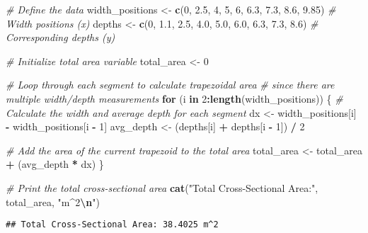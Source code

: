 \documentclass[
]{article}
\newenvironment{Shaded}{\begin{snugshade}}{\end{snugshade}}
\newcommand{\CommentTok}[1]{\textcolor[rgb]{0.56,0.35,0.01}{\textit{#1}}}
\newcommand{\ControlFlowTok}[1]{\textcolor[rgb]{0.13,0.29,0.53}{\textbf{#1}}}
\newcommand{\DecValTok}[1]{\textcolor[rgb]{0.00,0.00,0.81}{#1}}
\newcommand{\FloatTok}[1]{\textcolor[rgb]{0.00,0.00,0.81}{#1}}
\newcommand{\FunctionTok}[1]{\textcolor[rgb]{0.13,0.29,0.53}{\textbf{#1}}}
\newcommand{\NormalTok}[1]{#1}
\newcommand{\OtherTok}[1]{\textcolor[rgb]{0.56,0.35,0.01}{#1}}
\newcommand{\SpecialCharTok}[1]{\textcolor[rgb]{0.81,0.36,0.00}{\textbf{#1}}}
\newcommand{\StringTok}[1]{\textcolor[rgb]{0.31,0.60,0.02}{#1}}
\begin{document}
\begin{Shaded}
\begin{Highlighting}[]
\CommentTok{\# Define the data}
\NormalTok{width\_positions }\OtherTok{\textless{}{-}} \FunctionTok{c}\NormalTok{(}\DecValTok{0}\NormalTok{, }\FloatTok{2.5}\NormalTok{, }\DecValTok{4}\NormalTok{, }\DecValTok{5}\NormalTok{, }\DecValTok{6}\NormalTok{, }\FloatTok{6.3}\NormalTok{, }\FloatTok{7.3}\NormalTok{, }\FloatTok{8.6}\NormalTok{, }\FloatTok{9.85}\NormalTok{)  }\CommentTok{\# Width positions (x)}
\NormalTok{depths }\OtherTok{\textless{}{-}} \FunctionTok{c}\NormalTok{(}\DecValTok{0}\NormalTok{, }\FloatTok{1.1}\NormalTok{, }\FloatTok{2.5}\NormalTok{, }\FloatTok{4.0}\NormalTok{, }\FloatTok{5.0}\NormalTok{, }\FloatTok{6.0}\NormalTok{, }\FloatTok{6.3}\NormalTok{, }\FloatTok{7.3}\NormalTok{, }\FloatTok{8.6}\NormalTok{)      }\CommentTok{\# Corresponding depths (y)}

\CommentTok{\# Initialize total area variable}
\NormalTok{total\_area }\OtherTok{\textless{}{-}} \DecValTok{0}

\CommentTok{\# Loop through each segment to calculate trapezoidal area}
\CommentTok{\# since there are multiple \textquotesingle{}width/depth\textquotesingle{} measurements}
\ControlFlowTok{for}\NormalTok{ (i }\ControlFlowTok{in} \DecValTok{2}\SpecialCharTok{:}\FunctionTok{length}\NormalTok{(width\_positions)) \{}
  \CommentTok{\# Calculate the width and average depth for each segment}
\NormalTok{  dx }\OtherTok{\textless{}{-}}\NormalTok{ width\_positions[i] }\SpecialCharTok{{-}}\NormalTok{ width\_positions[i }\SpecialCharTok{{-}} \DecValTok{1}\NormalTok{]}
\NormalTok{  avg\_depth }\OtherTok{\textless{}{-}}\NormalTok{ (depths[i] }\SpecialCharTok{+}\NormalTok{ depths[i }\SpecialCharTok{{-}} \DecValTok{1}\NormalTok{]) }\SpecialCharTok{/} \DecValTok{2}
  
  \CommentTok{\# Add the area of the current trapezoid to the total area}
\NormalTok{  total\_area }\OtherTok{\textless{}{-}}\NormalTok{ total\_area }\SpecialCharTok{+}\NormalTok{ (avg\_depth }\SpecialCharTok{*}\NormalTok{ dx)}
\NormalTok{\}}

\CommentTok{\# Print the total cross{-}sectional area}
\FunctionTok{cat}\NormalTok{(}\StringTok{"Total Cross{-}Sectional Area:"}\NormalTok{, total\_area, }\StringTok{"m\^{}2}\SpecialCharTok{\textbackslash{}n}\StringTok{"}\NormalTok{)}
\end{Highlighting}
\end{Shaded}

\begin{verbatim}
## Total Cross-Sectional Area: 38.4025 m^2
\end{verbatim}
\end{document}
